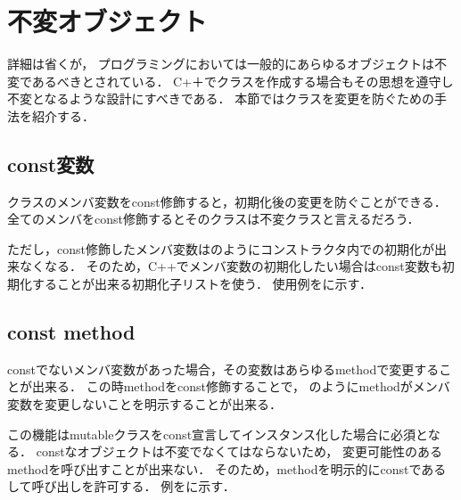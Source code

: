 
\section{不変オブジェクト}
詳細は省くが，
プログラミングにおいては一般的にあらゆるオブジェクトは不変であるべきとされている．
C+＋でクラスを作成する場合もその思想を遵守し不変となるような設計にすべきである．
本節ではクラスを変更を防ぐための手法を紹介する．


\subsection{const変数}
クラスのメンバ変数をconst修飾すると，初期化後の変更を防ぐことができる．
全てのメンバをconst修飾するとそのクラスは不変クラスと言えるだろう．

ただし，const修飾したメンバ変数はのようにコンストラクタ内での初期化が出来なくなる．
そのため，C++でメンバ変数の初期化したい場合はconst変数も初期化することが出来る初期化子リストを使う．
使用例をに示す．




\subsection{const method}
constでないメンバ変数があった場合，その変数はあらゆるmethodで変更することが出来る．
この時methodをconst修飾することで，
のようにmethodがメンバ変数を変更しないことを明示することが出来る．


この機能はmutableクラスをconst宣言してインスタンス化した場合に必須となる．
constなオブジェクトは不変でなくてはならないため，
変更可能性のあるmethodを呼び出すことが出来ない．
そのため，methodを明示的にconstであるして呼び出しを許可する．
例をに示す．


